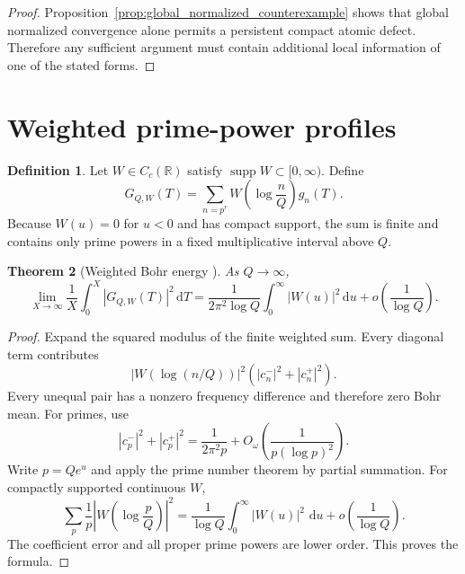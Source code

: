 \documentclass[11pt]{amsart}
\numberwithin{equation}{section}
\theoremstyle{plain}
\newtheorem{theorem}{Theorem}[section]
\theoremstyle{definition}
\newtheorem{definition}[theorem]{Definition}
\theoremstyle{remark}
\newcommand{\1}{\mathbf{1}}
\newcommand{\dd}{\,\mathrm{d}}
\begin{document}
\begin{proof}
Proposition~\ref{prop:global_normalized_counterexample} shows that global
normalized convergence alone permits a persistent compact atomic defect.
Therefore any sufficient argument must contain additional local
information of one of the stated forms.
\end{proof}

\section{Weighted prime-power profiles}
\label{sec:weighted_profiles}

\begin{definition}
\label{def:weighted_profile}
Let \(W\in C_c(\mathbb R)\) satisfy
\(\operatorname{supp}W\subset[0,\infty)\).  Define
\begin{equation}
G_{Q,W}(T)
=
\sum_{n=p^r}
W\left(\log\frac nQ\right)g_n(T).
\label{eq:weighted_profile_sum}
\end{equation}
Because \(W(u)=0\) for \(u<0\) and has compact support, the sum is finite
and contains only prime powers in a fixed multiplicative interval above
\(Q\).
\end{definition}


\begin{theorem}[Weighted Bohr energy {}]
\label{thm:weighted_bohr_energy}
As $Q\to\infty$,
\begin{equation}
\lim_{X\to\infty}\frac1X\int_0^X|G_{Q,W}(T)|^2\dd T
=
\frac1{2\pi^2\log Q}
\int_0^\infty|W(u)|^2\dd u
+
o\left(\frac1{\log Q}\right).
\label{eq:weighted_bohr_energy}
\end{equation}
\end{theorem}

\begin{proof}
Expand the squared modulus of the finite weighted sum.  Every diagonal term
contributes
\begin{equation}
|W(\log(n/Q))|^2
\left(|c_n^-|^2+|c_n^+|^2\right).
\label{eq:weighted_bohr_diagonal}
\end{equation}
Every unequal pair has a nonzero frequency difference and therefore zero
Bohr mean.  For primes, use
\begin{equation}
|c_p^-|^2+|c_p^+|^2
=
\frac1{2\pi^2p}
+
O_\omega\left(\frac1{p(\log p)^2}\right).
\label{eq:weighted_bohr_prime_coeff}
\end{equation}
Write \(p=Qe^u\) and apply the prime number theorem by partial summation.
For compactly supported continuous \(W\),
\begin{equation}
\sum_p\frac1p
\left|W\!\left(\log\frac pQ\right)\right|^2
=
\frac1{\log Q}
\int_0^\infty|W(u)|^2\,\dd u
+
o\left(\frac1{\log Q}\right).
\label{eq:weighted_bohr_pnt}
\end{equation}
The coefficient error and all proper prime powers are lower order.  This
proves the formula.
\end{proof}
\end{document}
